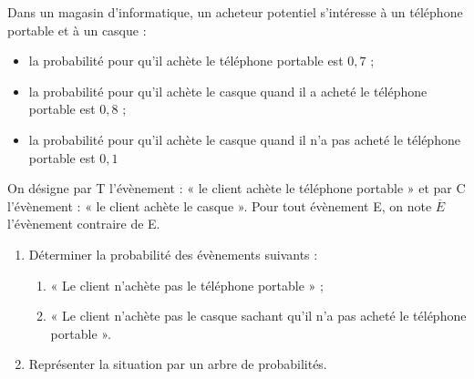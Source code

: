 \documentclass[a4paper,11pt]{article}
\begin{document}
Dans un magasin d’informatique, un acheteur potentiel s’intéresse à un téléphone portable et à un casque :
\begin{itemize}
	\item la probabilité pour qu’il achète le téléphone portable est $0,7$ ;
	\item la probabilité pour qu’il achète le casque quand il a acheté le téléphone portable est $0,8$ ;
	\item la probabilité pour qu’il achète le casque quand il n’a pas acheté le téléphone portable est $0,1$ 
\end{itemize}
On désigne par T l’évènement : « le client achète le téléphone portable » et par C l’évènement : « le client achète le casque ». Pour tout évènement E, on note $\overline{E}$ l’évènement contraire de E. 
\begin{enumerate}
	\item Déterminer la probabilité des évènements suivants : 
	\begin{enumerate}
		\item « Le client n'achète pas le téléphone portable » ;
		\item « Le client n'achète pas le casque sachant qu'il n’a pas acheté le téléphone portable ».
	\end{enumerate}
	\item Représenter la situation par un arbre de probabilités.

\end{enumerate}
\end{document}
